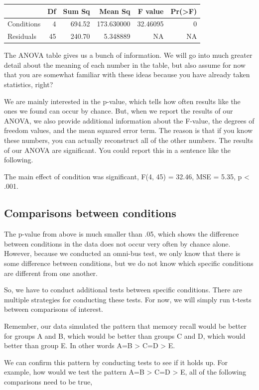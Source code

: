 \begin{tabular}{l|r|r|r|r|r}
\hline
  & Df & Sum Sq & Mean Sq & F value & Pr(>F)\\
\hline
Conditions & 4 & 694.52 & 173.630000 & 32.46095 & 0\\
\hline
Residuals & 45 & 240.70 & 5.348889 & NA & NA\\
\hline
\end{tabular}

The ANOVA table gives us a bunch of information. We will go into much
greater detail about the meaning of each number in the table, but also
assume for now that you are somewhat familiar with these ideas because
you have already taken statistics, right?

We are mainly interested in the p-value, which tells how often results
like the ones we found can occur by chance. But, when we report the
results of our ANOVA, we also provide additional information about the
F-value, the degrees of freedom values, and the mean squared error term.
The reason is that if you know these numbers, you can actually
reconstruct all of the other numbers. The results of our ANOVA are
significant. You could report this in a sentence like the following.

The main effect of condition was significant, F(4, 45) = 32.46, MSE =
5.35, p \textless{} .001.

\subsection{Comparisons between
conditions}\label{comparisons-between-conditions}

The p-value from above is much smaller than .05, which shows the
difference between conditions in the data does not occur very often by
chance alone. However, because we conducted an omni-bus test, we only
know that there is some difference between conditions, but we do not
know which specific conditions are different from one another.

So, we have to conduct additional tests between specific conditions.
There are multiple strategies for conducting these tests. For now, we
will simply run t-tests between comparisons of interest.

Remember, our data simulated the pattern that memory recall would be
better for groups A and B, which would be better than groups C and D,
which would better than group E. In other words A=B \textgreater{} C=D
\textgreater{} E.

We can confirm this pattern by conducting tests to see if it holds up.
For example, how would we test the pattern A=B \textgreater{} C=D
\textgreater{} E, all of the following comparisons need to be true,

